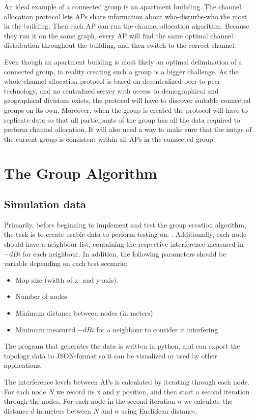 \documentclass[a4paper,UKenglish]{report}
\begin{document}
An ideal example of a connected group is an apartment builiding. The channel allocation protocol lets APs share information about who-disturbs-who the most in the building.
Then each AP can run the channel allocation algorithm. Because they run it on the same graph, every AP will find the same optimal channel distribution throughout the building,
and then switch to the correct channel. 

Even though an apartment building is most likely an optimal delimination of a connected group, in reality creating such a group is a bigger challenge. As the whole channel allocation
protocol is based on decentralized peer-to-peer technology, and no centralized server with access to demographical and geographical divisions exists, the protocol will
have to discover suitable connected groups on its own. Moreover, when the group is created the protocol will have to replicate data so that
all participants of the group has all the data required to perform channel allocation. It will also need a way to make sure that the image of the current group
is consistent within all APs in the connected group. 

\section{The Group Algorithm} 


\subsection{Simulation data}
Primarily, before beginning to implement and test the group creation algorithm, the task
is to create usable data to perform testing on. . Additionally, each node should have a neighbour list,
containing the respective interference measured in $-dBi$ for each neighbour. In addition,
the following parameters should be variable depending on each test scenario:

\begin{itemize}
\item Map size (width of x- and y-axis).
\item Number of nodes
\item Minimum distance between nodes (in meters)
\item Minimum measured $-dBi$ for a neighbour to consider it interfering
\end{itemize}

The program that generates the data is written in python, and can export the topology data to
JSON-format so it can be visualized or used by other applications.

The interference levels between APs is calculated by iterating through each node.
For each node $N$ we record its x and y position, and then start a second iteration through the nodes.
For each node in the second iteration $n$ we calculate the distance $d$ in
meters between $N$ and $n$ using Euclidean distance.



\printbibliography
\end{document}
